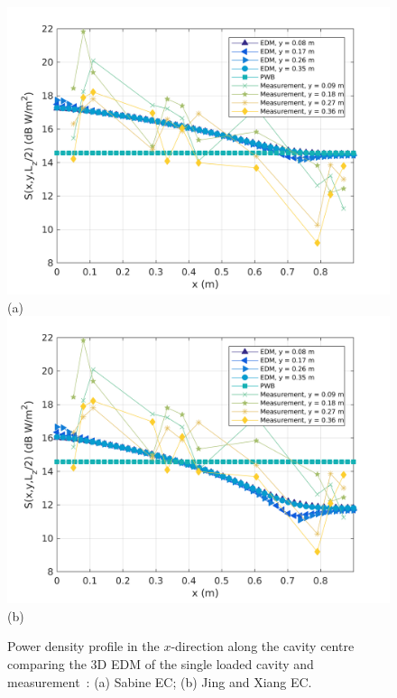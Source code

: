 \documentclass[a4paper]{article}
\numberwithin{equation}{section}
\begin{document}
\begin{figure}[hp]
\begin{center}
\includegraphics[width=0.6\linewidth]{figures/SDM_3D_SL_PowerDensityProfileXMeas}\\
{\footnotesize (a)}\\
\vspace{2mm}
\includegraphics[width=0.6\linewidth]{figures/SDM_3D_SL_PowerDensityProfileXMeas_JX}\\
{\footnotesize (b)}\\
\vspace{-2mm}
\caption{\label{fg:measprofssl} Power density profile in the $x$-direction along the cavity centre comparing
the 3D EDM of the single loaded cavity and measurement~\citep{Flintoft2017b}: (a) Sabine EC; (b) Jing and Xiang EC.}
\end{center}
\end{figure}
\end{document}
